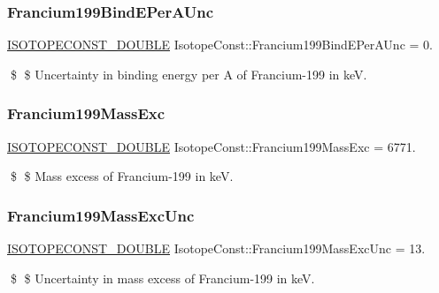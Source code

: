 \subsubsection{\texorpdfstring{Francium199\+Bind\+E\+Per\+A\+Unc}{Francium199BindEPerAUnc}}
{\footnotesize\ttfamily \mbox{\hyperlink{group___isotope_const-_macros_ga8f45a7272ce02c0b4c65c44636ed719a}{I\+S\+O\+T\+O\+P\+E\+C\+O\+N\+S\+T\+\_\+\+D\+O\+U\+B\+LE}} Isotope\+Const\+::\+Francium199\+Bind\+E\+Per\+A\+Unc = 0.}

\$ \$ Uncertainty in binding energy per A of Francium-\/199 in keV. \mbox{\label{group___isotope_const-_francium-_fr199_gadffa5894cf8dd599592cb959df470406}} 
\subsubsection{\texorpdfstring{Francium199\+Mass\+Exc}{Francium199MassExc}}
{\footnotesize\ttfamily \mbox{\hyperlink{group___isotope_const-_macros_ga8f45a7272ce02c0b4c65c44636ed719a}{I\+S\+O\+T\+O\+P\+E\+C\+O\+N\+S\+T\+\_\+\+D\+O\+U\+B\+LE}} Isotope\+Const\+::\+Francium199\+Mass\+Exc = 6771.}

\$ \$ Mass excess of Francium-\/199 in keV. \mbox{\label{group___isotope_const-_francium-_fr199_ga109c3bdd76070ef47ecb995ee81571bf}} 
\subsubsection{\texorpdfstring{Francium199\+Mass\+Exc\+Unc}{Francium199MassExcUnc}}
{\footnotesize\ttfamily \mbox{\hyperlink{group___isotope_const-_macros_ga8f45a7272ce02c0b4c65c44636ed719a}{I\+S\+O\+T\+O\+P\+E\+C\+O\+N\+S\+T\+\_\+\+D\+O\+U\+B\+LE}} Isotope\+Const\+::\+Francium199\+Mass\+Exc\+Unc = 13.}

\$ \$ Uncertainty in mass excess of Francium-\/199 in keV. \mbox{\label{group___isotope_const-_francium-_fr199_gabd18cf69b765074ac5819b617c16c11c}} 
